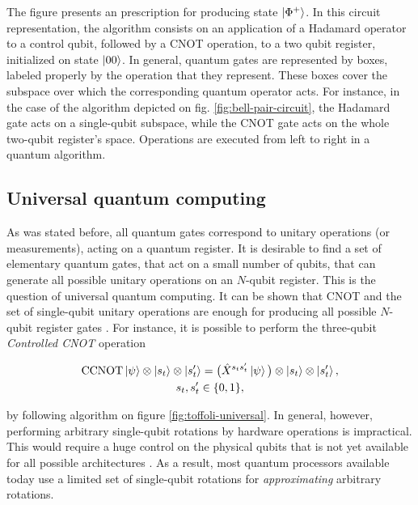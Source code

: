     

    The figure presents an prescription for producing state $\ket{\Phi^{+}}$. In this circuit representation, the algorithm consists on an application of a Hadamard operator to a control qubit, followed by a CNOT operation, to a two qubit register, initialized on state $\ket{00}$. In general, quantum gates are represented by boxes, labeled properly by the operation that they represent. These boxes cover the subspace over which the corresponding quantum operator acts. For instance, in the case of the algorithm depicted on fig. \ref{fig:bell-pair-circuit}, the Hadamard gate acts on a single-qubit subspace, while the CNOT gate acts on the whole two-qubit register's space. Operations are executed from left to right in a quantum algorithm.

  \subsection{Universal quantum computing}
  \label{subsec:UniversalQC}
    
    As was stated before, all quantum gates correspond to unitary operations (or measurements), acting on a quantum register. It is desirable to find a set of elementary quantum gates, that act on a small number of qubits, that can generate all possible unitary operations on an $N$-qubit register. This is the question of universal quantum computing. It can be shown that CNOT and the set of single-qubit unitary operations are enough for producing all possible $N$-qubit register gates \cite{Nielsen}. For instance, it is possible to perform the three-qubit \textit{Controlled CNOT} operation

    \begin{gather}
      \text{CCNOT} \ket{\psi} \otimes \ket{s_t} \otimes \ket{s'_t} = \big(\hat{X}^{s_t s'_t} \ket{\psi}\big) \otimes \ket{s_t} \otimes \ket{s'_t}, \\
      s_t, s'_t \in \{0,1\},
      \label{eq:toffoli-definition}
    \end{gather}

    \noindent by following algorithm on figure \ref{fig:toffoli-universal}. In general, however, performing arbitrary single-qubit rotations by hardware operations is impractical. This would require a huge control on the physical qubits that is not yet available for all possible architectures \cite{Nielsen}. As a result, most quantum processors available today use a limited set of single-qubit rotations for \textit{approximating} arbitrary rotations.

